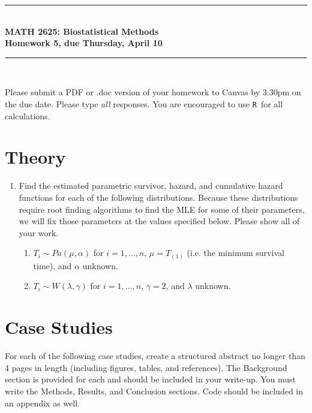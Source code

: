 \documentclass{article}
\newcommand{\HRule}{\rule{\linewidth}{0.5mm}}
\newcommand{\R}{\texttt{R}}
\begin{document}
	\begin{center}
		\HRule \\[0.1cm]
		\vspace{0.1cm}
		{ \LARGE \bfseries MATH 2625: Biostatistical Methods\\[0.5cm] Homework 5, due Thursday, April 10 } \\[0.1cm]
		\HRule \\[0.1cm]
	\end{center}
	
		Please submit a PDF or .doc version of your homework to Canvas by 3:30pm on the due date. Please type \emph{all} responses. You are encouraged to use \R\ for all calculations.
		
	\section*{Theory}
	\begin{enumerate}
		\item Find the estimated parametric survivor, hazard, and cumulative hazard functions for each of the following distributions. Because these distributions require root finding algorithms to find the MLE for some of their parameters, we will fix those parameters at the values specified below. Please show all of your work.
		\begin{enumerate}
			\item $T_i \sim Pa(\mu, \alpha)$ for $i = 1, \ldots, n$, $\mu = T_{(1)}$ (i.e. the minimum survival time), and $\alpha$ unknown.
			\item $T_i \sim W(\lambda, \gamma)$  for $i = 1, \ldots, n$, $\gamma = 2$, and $\lambda$ unknown.
		\end{enumerate}
	\end{enumerate}

	\section*{Case Studies}
	For each of the following case studies, create a structured abstract no longer than 4 pages in length (including figures, tables, and references). The Background section is provided for each and should be included in your write-up. You must write the Methods, Results, and Conclusion sections. Code should be included in an appendix as well.
\end{document}
